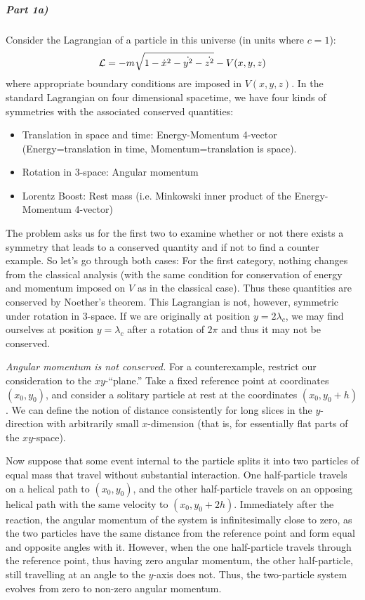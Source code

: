 \subparagraph*{Part 1a)}
Consider the Lagrangian of a particle in this universe (in units where $c=1$):
\[ \mathcal{L} = -m\sqrt{1-\dot{x}^2-\dot{y^2}-\dot{z^2}} - V(x,y,z)  \]
where appropriate boundary conditions are imposed in $V(x,y,z)$.
In the standard Lagrangian on four dimensional spacetime, we have four kinds of symmetries with the associated conserved quantities:
\begin{itemize}
\item Translation in space and time: Energy-Momentum 4-vector (Energy=translation in time, Momentum=translation is space).
\item Rotation in 3-space: Angular momentum
\item Lorentz Boost: Rest mass (i.e. Minkowski inner product of the Energy-Momentum 4-vector)
\end{itemize}
The problem asks us for the first two to examine whether or not there exists a symmetry that leads to a conserved quantity and if not to find a counter example. So let's go through both cases:
For the first category, nothing changes from the classical analysis (with the same condition for conservation of energy and momentum imposed on $V$ as in the classical case). Thus these quantities are conserved by Noether's theorem. This Lagrangian is not, however, symmetric under rotation in 3-space. If we are originally at position $y=2\lambda_c$, we may find ourselves at position $y=\lambda_c$ after a rotation of $2\pi$ and thus it may not be conserved. \par
\emph{Angular momentum is not conserved.}  For a counterexample, restrict our consideration to the $xy$-``plane.''  Take a fixed reference point at coordinates $(x_0, y_0)$, and consider a solitary particle at rest at the coordinates $(x_0, y_0 + h)$.  We can define the notion of distance consistently for long slices in the $y$-direction with arbitrarily small $x$-dimension (that is, for essentially flat parts of the $xy$-space).

Now suppose that some event internal to the particle splits it into two particles of equal mass that travel without substantial interaction.  One half-particle travels on a helical path to $(x_0, y_0)$, and the other half-particle travels on an opposing helical path with the same velocity to $(x_0, y_0 + 2h)$.  Immediately after the reaction, the angular momentum of the system is infinitesimally close to zero, as the two particles have the same distance from the reference point and form equal and opposite angles with it.  However, when the one half-particle travels through the reference point, thus having zero angular momentum, the other half-particle, still travelling at an angle to the $y$-axis does not.  Thus, the two-particle system evolves from zero to non-zero angular momentum.

